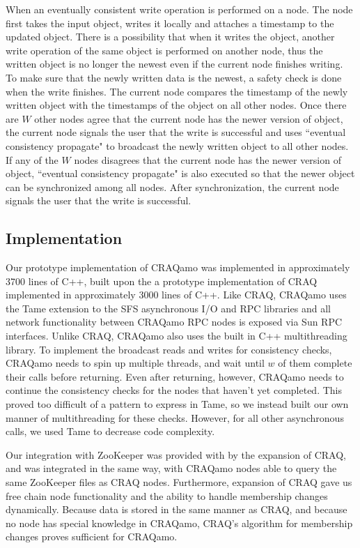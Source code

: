 When an eventually consistent write operation is performed on a node. The node first takes the input object, writes it locally and attaches a timestamp to the updated object. There is a possibility that when it writes the object, another write operation of the same object is performed on another node, thus the written object is no longer the newest even if the current node finishes writing. To make sure that the newly written data is the newest, a safety check is done when the write finishes. The current node compares the timestamp of the newly written object with the timestamps of the object on all other nodes. Once there are $W$ other nodes agree that the current node has the newer version of object, the current node signals the user that the write is successful and uses ``eventual consistency propagate" to broadcast the newly written object to all other nodes. If any of the $W$ nodes disagrees that the current node has the newer version of object, ``eventual consistency propagate" is also executed so that the newer object can be synchronized among all nodes. After synchronization, the current node signals the user that the write is successful. 


\subsection{Implementation}
Our prototype implementation of CRAQamo was implemented in approximately 3700 lines of C++,
built upon the a prototype implementation of CRAQ implemented in approximately 3000 lines of C++.
Like CRAQ, CRAQamo uses the Tame \cite{tame} extension to the SFS asynchronous I/O and RPC libraries \cite{sfs} and all network functionality between CRAQamo RPC nodes is exposed via Sun RPC interfaces.
Unlike CRAQ, CRAQamo also uses the built in C++ multithreading library.
To implement the broadcast reads and writes for consistency checks, CRAQamo needs to spin up multiple threads, and wait until $w$ of them complete their calls before returning.
Even after returning, however, CRAQamo needs to continue the consistency checks for the nodes that haven't yet completed.
This proved too difficult of a pattern to express in Tame, so we instead built our own manner of multithreading for these checks.
However, for all other asynchronous calls, we used Tame to decrease code complexity.

Our integration with ZooKeeper was provided with by the expansion of CRAQ, and was integrated in the same way, with CRAQamo nodes able to query the same ZooKeeper files as CRAQ nodes.
Furthermore, expansion of CRAQ gave us free chain node functionality and the ability to handle membership changes dynamically.
Because data is stored in the same manner as CRAQ, and because no node has special knowledge in CRAQamo, CRAQ's algorithm for membership changes proves sufficient for CRAQamo.
